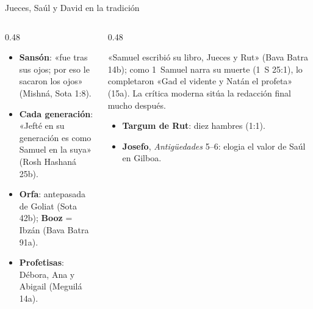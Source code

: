 \documentclass[hyperref={bookmarks=false},aspectratio=169]{beamer}
\begin{document}
\begin{frame}{Jueces, Saúl y David en la tradición}
\begin{columns}[T,onlytextwidth]
\begin{column}{0.48\textwidth}\footnotesize
\begin{itemize}
\item \textbf{Sansón}: «fue tras sus ojos; por eso le sacaron los ojos» (Mishná, Sota 1:8).
\item \textbf{Cada generación}: «Jefté en su generación es como Samuel en la suya» (Rosh Hashaná 25b).
\item \textbf{Orfa}: antepasada de Goliat (Sota 42b); \textbf{Booz} = Ibzán (Bava Batra 91a).
\item \textbf{Profetisas}: Débora, Ana y Abigail (Meguilá 14a).
\end{itemize}
\end{column}
\begin{column}{0.48\textwidth}
\begin{notalam}
«Samuel escribió su libro, Jueces y Rut» (Bava Batra 14b); como 1~Samuel narra su muerte (1~S 25:1), lo completaron «Gad el vidente y Natán el profeta» (15a). La crítica moderna sitúa la redacción final mucho después.
\end{notalam}
\footnotesize
\begin{itemize}
\item \textbf{Targum de Rut}: diez hambres (1:1).
\item \textbf{Josefo}, \emph{Antigüedades} 5--6: elogia el valor de Saúl en Gilboa.
\end{itemize}
\end{column}
\end{columns}
\end{frame}
\end{document}
